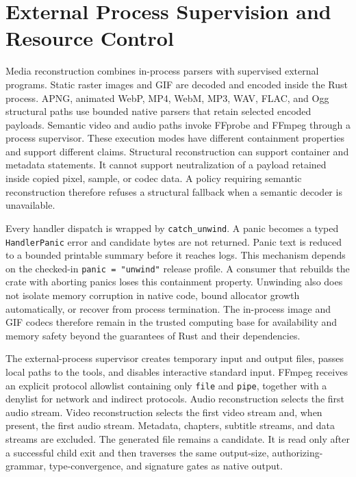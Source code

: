\section{External Process Supervision and Resource Control}\label{sec:process-isolation}

Media reconstruction combines in-process parsers with supervised external
programs. Static raster images and GIF are decoded and encoded inside the Rust
process. APNG, animated WebP, MP4, WebM, MP3, WAV, FLAC, and Ogg structural
paths use bounded native parsers that retain selected encoded payloads.
Semantic video and audio paths invoke FFprobe and FFmpeg through a process
supervisor. These execution modes have different containment properties and
support different claims.
Structural reconstruction can support container and metadata statements. It
cannot support neutralization of a payload retained inside copied pixel,
sample, or codec data. A policy requiring semantic reconstruction therefore
refuses a structural fallback when a semantic decoder is unavailable.

Every handler dispatch is wrapped by \texttt{catch\_unwind}. A panic becomes a
typed \texttt{HandlerPanic} error and candidate bytes are not returned. Panic
text is reduced to a bounded printable summary before it reaches logs. This
mechanism depends on the checked-in \texttt{panic = "unwind"} release profile.
A consumer that rebuilds the crate with aborting panics loses this containment
property. Unwinding also does not isolate memory corruption in native code,
bound allocator growth automatically, or recover from process termination.
The in-process image and GIF codecs therefore remain in the trusted computing
base for availability and memory safety beyond the guarantees of Rust and
their dependencies.

The external-process supervisor creates temporary input and output files,
passes local paths to the tools, and disables interactive standard input.
FFmpeg receives an explicit protocol allowlist containing only
\texttt{file} and \texttt{pipe}, together with a denylist for network and
indirect protocols. Audio reconstruction selects the first audio stream. Video
reconstruction selects the first video stream and, when present, the first
audio stream. Metadata, chapters, subtitle streams, and data streams are
excluded. The generated file remains a candidate. It is read only
after a successful child exit and then traverses the same output-size,
authorizing-grammar, type-convergence, and signature gates as native output.

